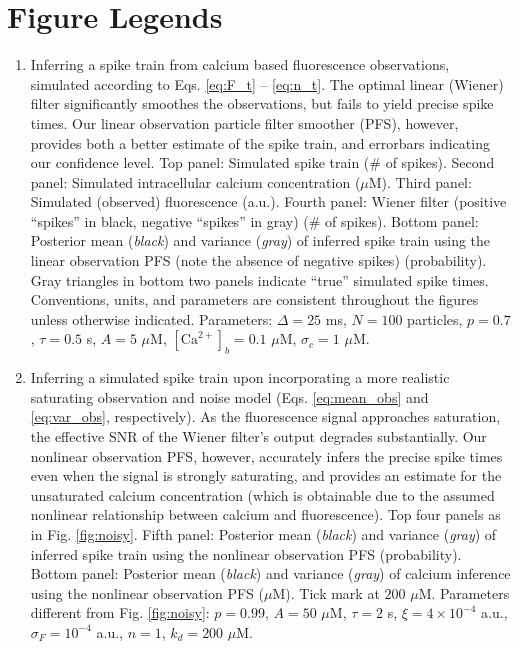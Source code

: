 \documentclass[10pt]{article}
\newcommand{\Ca}{[\text{Ca}^{2+}]}
\begin{document}
\section*{Figure Legends}
\begin{enumerate}
\item Inferring a spike train from calcium based fluorescence observations, simulated according to Eqs. \ref{eq:F_t} -- \ref{eq:n_t}.  The optimal linear (Wiener) filter significantly smoothes the observations, but fails to yield precise spike times. Our linear observation particle filter smoother (PFS), however, provides both a better estimate of the spike train, and errorbars indicating our confidence level. Top panel: Simulated spike train ($\#$ of spikes). Second panel: Simulated intracellular calcium concentration ($\mu$M).  Third panel: Simulated (observed) fluorescence (a.u.).  Fourth panel: Wiener filter (positive ``spikes'' in black, negative ``spikes'' in gray) ($\#$ of spikes).  Bottom panel: Posterior mean (\emph{black}) and variance (\emph{gray}) of inferred spike train using the linear observation PFS (note the absence of negative spikes) (probability).  Gray triangles in bottom two panels indicate ``true'' simulated spike times. Conventions, units, and parameters are consistent throughout the figures unless otherwise indicated. Parameters: $\Delta=25$ ms, $N=100$ particles, $p=0.7$, $\tau=0.5$ s, $A=5$ $\mu$M, $\Ca_b=0.1$ $\mu$M, $\sigma_c=1$ $\mu$M.
\item Inferring a simulated spike train upon incorporating a more realistic saturating observation and noise model (Eqs. \ref{eq:mean_obs} and \ref{eq:var_obs}, respectively). As the fluorescence signal approaches saturation, the effective SNR of the Wiener filter's output degrades substantially.  Our nonlinear observation PFS, however, accurately infers the precise spike times even when the signal is strongly saturating, and provides an estimate for the unsaturated calcium concentration (which is obtainable due to the assumed nonlinear relationship between calcium and fluorescence). Top four panels as in Fig. \ref{fig:noisy}. Fifth panel: Posterior mean (\emph{black}) and variance (\emph{gray}) of inferred spike train using the nonlinear observation PFS (probability).  Bottom panel: Posterior mean (\emph{black}) and variance (\emph{gray}) of calcium inference using the nonlinear observation PFS ($\mu$M). Tick mark at $200$ $\mu$M.  Parameters different from Fig. \ref{fig:noisy}: $p=0.99$, $A=50$ $\mu$M, $\tau=2$ s, $\xi=4 \times 10^{-4}$ a.u., $\sigma_F=10^{-4}$ a.u., $n=1$, $k_d=200$ $\mu$M.  

\end{enumerate}
\end{document}
